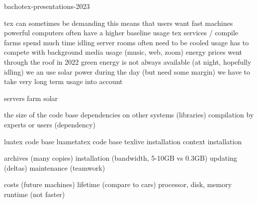 
\environment bachotex-presentations-2023

\startdocument
  [title={how green is tex},
   banner={some thoughts},
   author={Hans Hagen},
   location={bachotex\enspace {\bf 2023}\enspace meeting}]

\starttitle[title=Introduction]

\startitemize[packed]
    \startitem tex can sometimes be demanding \stopitem
    \startitem this means that users want fast machines \stopitem
    \startitem powerful computers often have a higher baseline usage \stopitem
    \startitem tex services / compile farms spend much time idling \stopitem
    \startitem server rooms often need to be cooled \stopitem
    \startitem usage has to compete with background media usage (music, web, zoom) \stopitem
    \startitem energy prices went through the roof in 2022 \stopitem
    \startitem green energy is not always available (at night, hopefully idling) \stopitem
    \startitem we an use solar power during the day (but need some margin) \stopitem
    \startitem we have to take very long term usage into account \stopitem
\stopitemize

\starttyping
servers
farm
solar
\stoptyping

\stoptitle

\starttitle[title=Engines]

\startitemize[packed]
    \startitem the size of the code base \stopitem
    \startitem dependencies on other systems (libraries)\stopitem
    \startitem compilation by experts or users (dependency) \stopitem
\stopitemize

\starttyping
luatex code base
luametatex code base
texlive installation
context installation
\stoptyping

\stoptitle

\starttitle[title=Deployment]

\startitemize[packed]
    \startitem archives (many copies) \stopitem
    \startitem installation (bandwidth, 5-10GB vs 0.3GB) \stopitem
    \startitem updating (deltas) \stopitem
    \startitem maintenance (teamwork) \stopitem
\stopitemize

\stoptitle

\starttitle[title=Hardware]

\startitemize[packed]
    \startitem costs (future machines) \stopitem
    \startitem lifetime (compare to cars) \stopitem
    \startitem processor, disk, memory \stopitem
    \startitem runtime (not faster) \stopitem
\stopitemize

